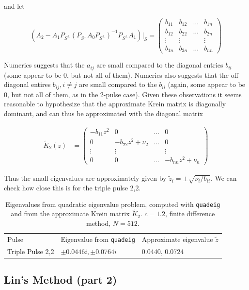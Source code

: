 \documentclass[12pt]{article}
\begin{document}
and let

\[
\left( A_2 - A_1 P_{S^\perp} (P_{S^\perp} A_0 P_{S^\perp})^{-1} P_{S^\perp} A_1 \right)|_S = 
\begin{pmatrix} b_{11} & b_{12} & \dots & b_{1n} \\ 
b_{12} & b_{22}  & \dots & b_{2n} \\
\vdots & \vdots & & \vdots \\
b_{1n} & b_{2n}  & \dots & b_{nn}
\end{pmatrix}
\]

Numerics suggests that the $a_{ij}$ are small compared to the diagonal entries $b_{ii}$ (some appear to be 0, but not all of them). Numerics also suggests that the off-diagonal entires $b_{ij}, i \neq j$ are small compared to the $b_{ii}$ (again, some appear to be 0, but not all of them, as in the 2-pulse case). Given these observations it seems reasonable to hypothesize that the approximate Krein matrix is diagonally dominant, and can thus be approximated with the diagonal matrix

\begin{align*}
\tilde{K}_2(z) &= \begin{pmatrix}
-b_{11} z^2 & 0 & \dots & 0\\
0 & -b_{22} z^2 + \nu_2 & \dots & 0 \\
\vdots & \vdots & & \vdots \\
0 & 0 & \dots & -b_{nn} z^2 + \nu_n
\end{pmatrix}
\end{align*}

Thus the small eigenvalues are approximately given by $\tilde{z}_i = \pm \sqrt{\nu_i / b_{ii}}$. We can check how close this is for the triple pulse 2,2.

\begin{table}[H]
\begin{tabular}{lll}
Pulse & Eigenvalue from \texttt{quadeig} & Approximate eigenvalue $\tilde{z}$ \\
Triple Pulse 2,2  & $\pm 0.0446i, \pm 0.0764i$ & 0.0440, 0.0724 \\
\end{tabular}
\caption{Eigenvalues from quadratic eigenvalue problem, computed with \texttt{quadeig} and from the approximate Krein matrix $\tilde{K}_2$. $c = 1.2$, finite difference method, $N = 512$. }
\end{table}

\subsection{Lin's Method (part 2)}
\end{document}
